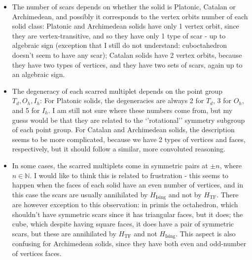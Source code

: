 \documentclass[11pt,a4paper]{article}
\newcommand{\Hising}{H_{\mathrm{Ising}}}
\newcommand{\Htf}{H_{\mathrm{TF}}}
\begin{document}
\begin{itemize}
\item The number of scars depends on whether the solid is Platonic, Catalan or Archimedean, and possibly it corresponds to the vertex orbits number of each solid class: Platonic and Archimedean solids have only 1 vertex orbit, since they are vertex-transitive, and so they have only 1 type of scar - up to algebraic sign (exception that I still do not understand: cuboctahedron doesn't seem to have any scar); Catalan solids have 2 vertex orbits, because they have two types of vertices, and they have two sets of scars, again up to an algebraic sign.\\
\item The degeneracy of each scarred multiplet depends on the point group $T_d, O_h, I_h$: For Platonic solids, the degeneracies are always 2 for $T_d$, 3 for $O_h$, and 5 for $I_h$. I am still not sure where these numbers come from, but my guess would be that they are related to the `'rotational'' symmetry subgroup of each point group. For Catalan and Archimedean solids, the description seems to be more complicated, because we have 2 types of vertices and faces, respectively, but it should follow a similar, more convoluted reasoning.
\item In some cases, the scarred multiplets come in symmetric pairs at $\pm n$, where $n\in\mathbb{N}$. I would like to think this is related to frustration - this seems to happen when the faces of each solid have an even number of vertices, and in this case the scars are usually annihilated by $\Hising$ and not by $\Htf$. There are however exception to this observation: in primis the octahedron, which shouldn't have symmetric scars since it has triangular faces, but it does; the cube, which despite having square faces, it does have a pair of symmetric scars, but these are annihilated by $\Htf$ and not  $\Hising$. This aspect is also confusing for Archimedean solids, since they have both even and odd-number of vertices faces.
\end{itemize}
\end{document}
